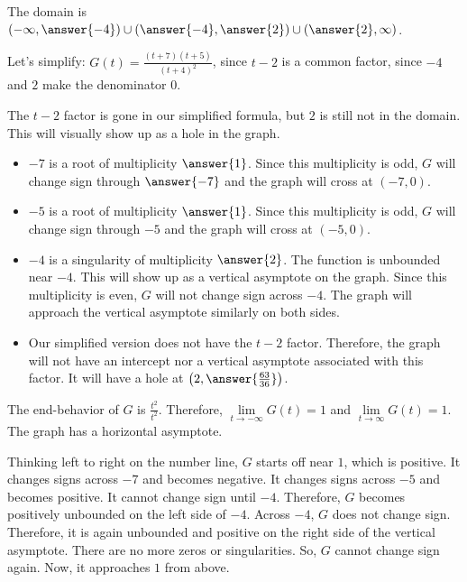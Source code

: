\documentclass{ximera}
\begin{document}
\begin{explanation}



The domain is $\left( -\infty, \answer{-4} \right) \cup \left(\answer{-4}, \answer{2} \right) \cup \left( \answer{2}, \infty \right)$.

Let's simplify: $G(t) = \frac{(t+7)(t+5)}{(t+4)^2}$, since $t-2$ is a common factor, since $-4$ and $2$ make the denominator $0$.



The $t-2$ factor is gone in our simplified formula, but $2$ is still not in the domain.  This will visually show up as a hole in the graph.



\begin{itemize}
\item $-7$ is a root of multiplicity $\answer{1}$.  Since this multiplicity is odd, $G$ will change sign through $\answer{-7}$ and the graph will cross at $(-7,0)$.
\item $-5$ is a root of multiplicity $\answer{1}$.  Since this multiplicity is odd, $G$ will change sign through $-5$ and the graph will cross at $(-5,0)$.
\item $-4$ is a singularity of multiplicity $\answer{2}$.  The function is unbounded near $-4$.  This will show up as a vertical asymptote on the graph. Since this multiplicity is even, $G$ will not change sign across $-4$.  The graph will approach the vertical asymptote similarly on both sides.
\item Our simplified version does not have the $t-2$ factor.  Therefore, the graph will not have an intercept nor a vertical asymptote associated with this factor.  It will have a hole at $\left( 2, \answer{\frac{63}{36}} \right)$.
\end{itemize}


The end-behavior of $G$ is $\frac{t^2}{t^2}$.  Therefore, $\lim\limits_{t \to -\infty}G(t) = 1$ and $\lim\limits_{t \to \infty}G(t) = 1$.  The graph has a horizontal asymptote.




Thinking left to right on the number line, $G$ starts off near $1$, which is positive.  It changes signs across $-7$ and becomes negative. It changes signs across $-5$ and becomes positive.  It cannot change sign until $-4$.  Therefore, $G$ becomes positively unbounded on the left side of $-4$.  Across $-4$, $G$ does not change sign.  Therefore, it is again unbounded and positive on the right side of the vertical asymptote.  There are no more zeros or singularities.  So, $G$ cannot change sign again.  Now, it approaches $1$ from above.





\end{explanation}
\end{document}
